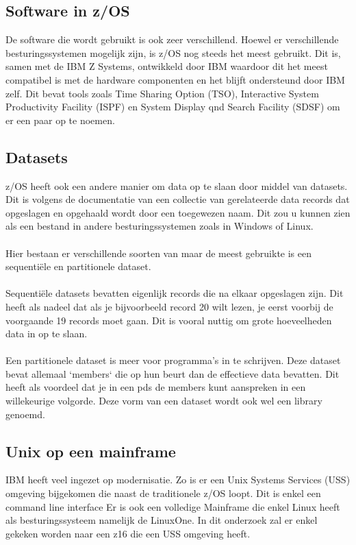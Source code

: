 \subsection{Software in z/OS}
De software die wordt gebruikt is ook zeer verschillend. Hoewel er verschillende besturingssystemen mogelijk zijn, is z/OS nog steeds het meest gebruikt. Dit is, samen met de IBM Z Systems, ontwikkeld door IBM waardoor dit het meest compatibel is met de hardware componenten en het blijft ondersteund door IBM zelf. Dit bevat tools zoals Time Sharing Option (TSO), Interactive System Productivity Facility (ISPF) en System Display qnd Search Facility (SDSF) om er een paar op te noemen.

\subsection{Datasets}
z/OS heeft ook een andere manier om data op te slaan door middel van datasets. Dit is volgens de documentatie van \textcite{IBM} een collectie van gerelateerde data records dat opgeslagen en opgehaald wordt door een toegewezen naam. Dit zou u kunnen zien als een bestand in andere besturingssystemen zoals in Windows of Linux. \\ \\
Hier bestaan er verschillende soorten van maar de meest gebruikte is een sequentiële en partitionele dataset. \\ \\
Sequentiële datasets bevatten eigenlijk records die na elkaar opgeslagen zijn. Dit heeft als nadeel dat als je bijvoorbeeld record 20 wilt lezen, je eerst voorbij de voorgaande 19 records moet gaan. Dit is vooral nuttig om grote hoeveelheden data in op te slaan. \\ \\
Een partitionele dataset is meer voor programma's in te schrijven. Deze dataset bevat allemaal `members` die op hun beurt dan de effectieve data bevatten. Dit heeft als voordeel dat je in een pds de members kunt aanspreken in een willekeurige volgorde. Deze vorm van een dataset wordt ook wel een library genoemd.

\subsection{Unix op een mainframe}
IBM heeft veel ingezet op modernisatie. Zo is er een Unix Systems Services (USS) omgeving bijgekomen die naast de traditionele z/OS loopt. Dit is enkel een command line interface  Er is ook een volledige Mainframe die enkel Linux heeft als besturingssysteem namelijk de LinuxOne. In dit onderzoek zal er enkel gekeken worden naar een z16 die een USS omgeving heeft.

